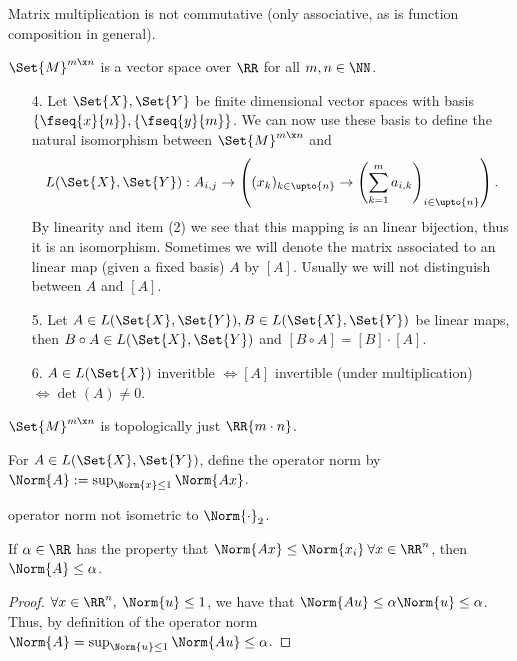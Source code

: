 \begin{rem}
 Matrix multiplication is not commutative (only associative, as is function composition in general).
\end{rem}
\begin{rem}
 $\Set{M}^{m\x n}$ is a vector space over $\RR$ for all $m,n\in\NN$.
\end{rem}
\begin{enumerate}
 \item[4.] Let $\Set{X}, \Set{Y}$ be finite dimensional vector spaces with basis $\{\fseq{x}{n}\}, \linebreak[4]\{\fseq{y}{m}\}$. We can now use these basis to define the natural isomorphism between $\Set{M}^{m\x n}$ and \[L(\Set{X},\Set{Y}): A_{i,j}\to \left((x_k)_{k\in\upto{n}}\to \left(\sum_{k=1}^{m}a_{i,k}\right)_{i\in\upto{n}}\right).\] By linearity and item (2) we see that this mapping is an linear bijection, thus it is an isomorphism. 
 Sometimes we will denote the matrix associated to an linear map (given a fixed basis) $A$ by $[A]$. Usually we will not distinguish between $A$ and $[A]$. 
 \item[5.] Let $A\in L(\Set{X},\Set{Y}), B\in L(\Set{X},\Set{Y})$ be linear maps, then $B\circ A\in L(\Set{X},\Set{Y})$ and $[B\circ A]=[B]\cdot[A]$.
 \item[6.] $A\in L(\Set{X})$ inveritble $\Leftrightarrow [A]$ invertible (under multiplication) $\Leftrightarrow\det(A)\neq 0$. 
\end{enumerate}
\begin{rem}
	$\Set{M}^{m\x n}$ is topologically just $\RR{m\cdot n}$. 
\end{rem}
\begin{defn}
 For $A\in L(\Set{X},\Set{Y})$, define the operator norm by $\Norm{A}:=\sup_{\Norm{x}\leq 1}\Norm{A x}$.
\end{defn}
\begin{rem}
 operator norm not isometric to $\Norm{\cdot}_2$.
\end{rem}
\begin{lem}
 \label{lem:obvbndOpNorm}
 If $\alpha\in\RR$ has the property that $\Norm{A x}\leq \Norm{x_i}\:\forall x\in\RR^n$, then $\Norm{A}\leq \alpha$.
\end{lem}
\begin{proof}
 $\forall x\in\RR^n,\:\Norm{u}\leq 1$, we have that $\Norm{Au}\leq \alpha\Norm{u}\leq\alpha$. Thus, by definition of the operator norm $\Norm{A}=\sup_{\Norm{u}\leq 1}\Norm{Au}\leq \alpha$.
\end{proof}
